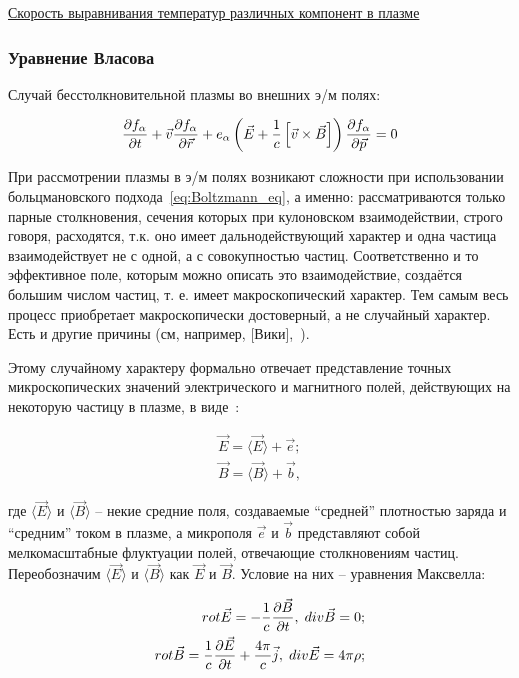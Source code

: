 \documentclass[10pt, a4paper]{article}
\begin{document}
\uline{Скорость выравнивания температур различных компонент в плазме}

\subsubsection{Уравнение Власова} \label{subsubsec:Vlasov_eq}

Случай бесстолкновительной плазмы во внешних э/м полях:

\begin{equation} \label{eq:Vlasov_eq_main}
	\pdv{f_\alpha}{t}+\vec{v}\pdv{f_\alpha}{\vec{r}}+e_\alpha\left(\vec{E}+
	\frac{1}{c}\left[\vec{v}\times\vec{B}\right]\right)\pdv{f_\alpha}{\vec{p}}=0
\end{equation}

При рассмотрении плазмы в э/м полях возникают сложности при использовании больцмановского подхода~\eqref{eq:Boltzmann_eq}, а именно: рассматриваются только парные столкновения, сечения которых при кулоновском взаимодействии, строго говоря, расходятся, т.к. оно имеет дальнодействующий характер и одна частица взаимодействует не с одной, а с совокупностью частиц. Соответственно и то эффективное поле, которым можно описать
это взаимодействие, создаётся большим числом частиц, т. е. имеет
макроскопический характер. Тем самым весь процесс приобретает
макроскопически достоверный, а не случайный характер. Есть и другие причины (см, например, [Вики],~\cite{kotelnikov}).

Этому случайному характеру формально отвечает представление точных
микроскопических значений электрического и магнитного полей, действующих на некоторую частицу в плазме, в виде~\cite{kotelnikov}:

\begin{align*}
	\vec{E} = \langle\vec{E}\rangle+\vec{e};\\
	\vec{B} = \langle\vec{B}\rangle+\vec{b},	
\end{align*}

где $\langle\vec{E}\rangle$ и $\langle\vec{B}\rangle$ -- некие средние поля, создаваемые ``средней'' плотностью заряда и ``средним'' током в плазме, а микрополя $\vec{e}$ и $\vec{b}$ представляют собой мелкомасштабные флуктуации полей, отвечающие
столкновениям частиц. Переобозначим $\langle\vec{E}\rangle$ и $\langle\vec{B}\rangle$ как $\vec{E}$ и $\vec{B}$. Условие на них -- уравнения Максвелла:

\begin{align} \label{eq:Vlasov_eq_Maxwell}
	rot\vec{E} = -\frac{1}{c}\pdv{\vec{B}}{t},\;div\vec{B}=0;\\
	rot\vec{B} = \frac{1}{c}\pdv{\vec{E}}{t} + \frac{4\pi}{c}\vec{j},\;div\vec{E}=4\pi\rho;
\end{align}
\end{document}
